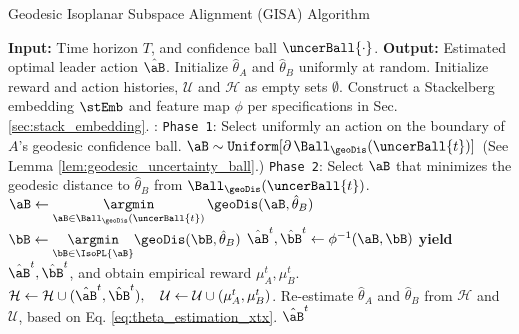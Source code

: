 \begin{algorithm}[h!]
\caption{Geodesic Isoplanar Subspace Alignment (GISA) Algorithm}\label{alg:gisa}
\begin{algorithmic}[1]
\State \textbf{Input:} Time horizon $T$, and confidence ball $\uncerBall{\cdot}$.
\State \textbf{Output:} Estimated optimal leader action $\hat{\aB}$.
\State Initialize $\hat{\theta}_A$ and $\hat{\theta}_B$ uniformly at random.
\State Initialize reward and action histories, $\mathcal{U}$ and $\mathcal{H}$ as empty sets $\emptyset$.
\State Construct a Stackelberg embedding $\stEmb$ and feature map $\phi$ per specifications in Sec. \ref{sec:stack_embedding}.
:
        \State \texttt{Phase 1}: Select uniformly an action on the boundary of $A$'s geodesic confidence ball.
        \State $\aB \sim \texttt{Uniform}[\partial \, \Ball_{\geoDis}(\uncerBall{t})] \,$ (See Lemma \ref{lem:geodesic_uncertainty_ball}.)
    \Else
        \State \texttt{Phase 2}: Select $\aB$ that minimizes the geodesic distance to $\hat{\theta}_B$ from $\Ball_{\geoDis}(\uncerBall{t})$.
        \State $\aB \gets \underset{\aB \in \Ball_{\geoDis}(\uncerBall{t})}{\argmin} \,
 \geoDis(\aB, \hat{\theta}_B)$
    \EndIf
    \State $\bB \gets \underset{\bB \in \IsoPL{\aB}}{\argmin}\geoDis(\bB, \hat{\theta}_B)$
    \State $\hat{\aB}^t, \hat{\bB}^t \gets \phi^{-1}(\aB, \bB)$ 
    \State \textbf{yield} $\hat{\aB}^t, \hat{\bB}^t$, and obtain empirical reward $\mu_A^t, \mu_B^t$.
    \State $\mathcal{H} \gets \mathcal{H} \cup (\hat{\aB}^t, \hat{\bB}^t), \quad \mathcal{U} \gets \mathcal{U} \cup (\mu_A^t, \mu_B^t)$.
    \State Re-estimate $\hat{\theta}_A$ and $\hat{\theta}_B$ from $\mathcal{H}$ and $\mathcal{U}$, based on Eq. \eqref{eq:theta_estimation_xtx}.
\EndFor
\State \Return $\hat{\aB}^t$

\end{algorithmic}
\end{algorithm}

